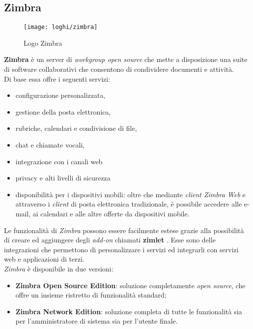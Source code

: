 \subsection{Zimbra} \label{subsec:Zimbra}
\begin{figure}[H] 
	\centering
	\texttt{[image: loghi/zimbra]}
	\caption{Logo Zimbra}
	\label{fig:logoZimbra}
\end{figure}
\textbf{Zimbra}  è un server di \emph{workgroup open source} che mette a disposizione una suite di software collaborativi che consentono di condividere documenti e attività. \\
Di base essa offre i seguenti servizi:
\begin{itemize}
	\item configurazione personalizzata,
	\item gestione della posta elettronica,
	\item rubriche, calendari e condivisione di file,
	\item chat e chiamate vocali,
	\item integrazione con i canali web
	\item privacy e alti livelli di sicurezza
	\item disponibilità per i dispositivi mobili: oltre che mediante \emph{client Zimbra Web} e attraverso i \emph{client} di posta elettronica tradizionale, è possibile accedere alle e-mail, ai calendari e alle altre offerte da dispositivi mobile. 
\end{itemize}
Le funzionalità di \emph{Zimbra} possono essere facilmente estese grazie alla possibilità di creare ed aggiungere degli \emph{add-on} chiamati \textbf{zimlet} . Esse sono delle integrazioni che permettono di personalizzare i servizi ed integrarli con servizi web e applicazioni di terzi.\\
\emph{Zimbra} è disponibile in due versioni: 
\begin{itemize}
	\item \textbf{Zimbra Open Source Edition}: soluzione completamente \emph{open source}, che offre un insieme ristretto di funzionalità standard;
	\item \textbf{Zimbra Network Edition}: soluzione completa di tutte le funzionalità sia per l'amministratore di sistema sia per l'utente finale.
\end{itemize}


